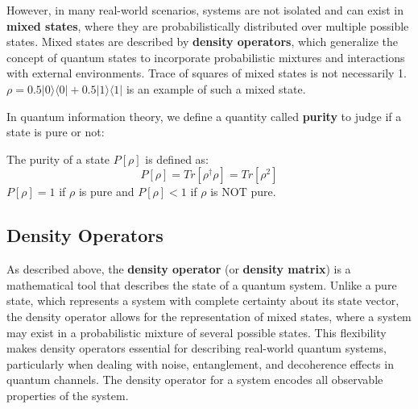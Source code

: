 However, in many real-world scenarios, systems are not isolated and can exist in \textbf{mixed states},
where they are probabilistically distributed over multiple possible states. Mixed states are described
by \textbf{density operators}, which generalize the concept of quantum states to incorporate
probabilistic mixtures and interactions with external environments. Trace of squares of mixed states is
not necessarily 1. $\rho = 0.5 |0 \rangle \langle 0| + 0.5 |1 \rangle \langle 1|$ is an example of such
a mixed state.

In quantum information theory, we define a quantity called \textbf{purity} to judge if a state is pure
or not:

\begin{definition}[Purity]
    The purity of a state $P[\rho]$ is defined as:
    \begin{equation}
        P[\rho] = Tr[\rho^\dagger\rho] = Tr[\rho^2]
    \end{equation}
    $P[\rho] = 1$ if $\rho$ is pure and $P[\rho] < 1$ if $\rho$ is NOT pure.
\end{definition}

\subsection{Density Operators}

As described above, the \textbf{density operator} (or \textbf{density matrix})
is a mathematical tool that describes the state of a quantum system. Unlike a pure state, which
represents a system with complete certainty about its state vector, the density operator allows
for the representation of mixed states, where a system may exist in a probabilistic mixture of
several possible states. This flexibility makes density operators essential for describing
real-world quantum systems, particularly when dealing with noise, entanglement, and decoherence
effects in quantum channels. The density operator for a system encodes all observable properties
of the system.

